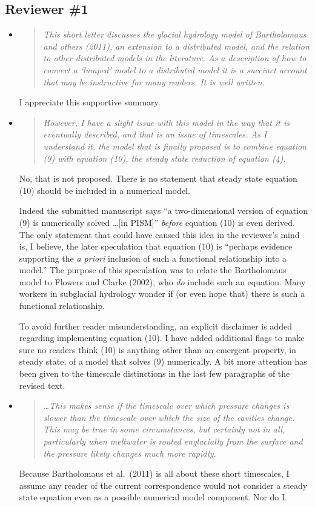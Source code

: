 \documentclass[11pt,reqno]{amsart}
\newcommand{\reply}[2]{
\medskip\medskip
\item  \begin{quote}
\emph{#1}
\end{quote}

\medskip
\noindent #2}
\begin{document}
\subsection*{Reviewer \#1}  \begin{itemize}
\reply{This short letter discusses the glacial hydrology model of Bartholomaus and others (2011), an extension to a distributed model, and the relation to other distributed models in the literature.  As a description of how to convert a `lumped' model to a distributed model it is a succinct account that may be instructive for many readers.  It is well written.}
{I appreciate this supportive summary.}

\reply{However, I have a slight issue with this model in the way that it is eventually described, and that is an issue of timescales.  As I understand it, the model that is finally proposed is to combine equation (9) with equation (10), the steady state reduction of equation (4).}
{No, that is not proposed.  There is no statement that steady state equation (10) should be included in a numerical model.

Indeed the submitted manuscript says ``a two-dimensional version of equation (9) is numerically solved \dots [in PISM]'' \emph{before} equation (10) is even derived.  The only statement that could have caused this idea in the reviewer's mind is, I believe, the later speculation that equation (10) is ``perhaps evidence supporting the \emph{a priori} inclusion of such a functional relationship into a model.''  The purpose of this speculation was to relate the Bartholomaus model to Flowers and Clarke (2002), who \emph{do} include such an equation.  Many workers in subglacial hydrology wonder if (or even hope that) there is such a functional relationship.

To avoid further reader misunderstanding, an explicit disclaimer is added regarding implementing equation (10).  I have added additional flags to make sure no readers think (10) is anything other than an emergent property, in steady state, of a model that solves (9) numerically.  A bit more attention has been given to the timescale distinctions in the last few paragraphs of the revised text.}

\reply{\dots This makes sense if the timescale over which pressure changes is slower than the timescale over which the size of the cavities change. This may be true in some circumstances, but certainly not in all, particularly when meltwater is routed englacially from the surface and the pressure likely changes much more rapidly.}
{Because Bartholomaus et al.~(2011) is all about these short timescales, I assume any reader of the current correspondence would not consider a steady state equation even as a possible numerical model component.  Nor do I.

}
\end{itemize}
\end{document}
